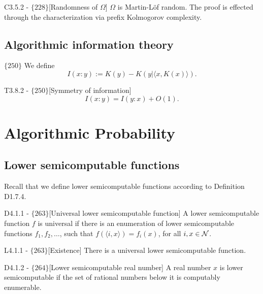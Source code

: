 \documentclass{article}
\begin{document}
\begin{flexitheorem}{C3.5.2 - $\{228\}$}[Randomness of $\Omega$]
    $\Omega$ is Martin-Löf random. The proof is effected through the characterization via prefix Kolmogorov complexity.
\end{flexitheorem}

\subsection{Algorithmic information theory}

$\{250\}$ We define 
\begin{equation}
    I(x : y) := K(y) - K(y | \langle x, K(x) \rangle).
\end{equation}

\begin{flexitheorem}{T3.8.2 - $\{250\}$}[Symmetry of information]
    \begin{equation}
        I(x:y) = I(y:x) + O(1).
    \end{equation}
\end{flexitheorem}

\section{Algorithmic Probability}

\subsection{Lower semicomputable functions}

Recall that we define lower semicomputable functions according to Definition D1.7.4.

\begin{flexidefinition}{D4.1.1 - $\{263\}$}[Universal lower semicomputable function]
    A lower semicomputable function $f$ is universal if there is an enumeration of lower semicomputable functions $f_1,f_2,\ldots$, such that $f(\langle i,x \rangle) = f_i(x)$, for all $i,x \in \mathcal{N}$.
\end{flexidefinition}

\begin{flexilemma}{L4.1.1 - $\{263\}$}[Existence]
    There is a universal lower semicomputable function.
\end{flexilemma}

\begin{flexidefinition}{D4.1.2 - $\{264\}$}[Lower semicomputable real number]
    A real number $x$ is lower semicomputable if the set of rational numbers below it is computably enumerable.
\end{flexidefinition}
\end{document}
